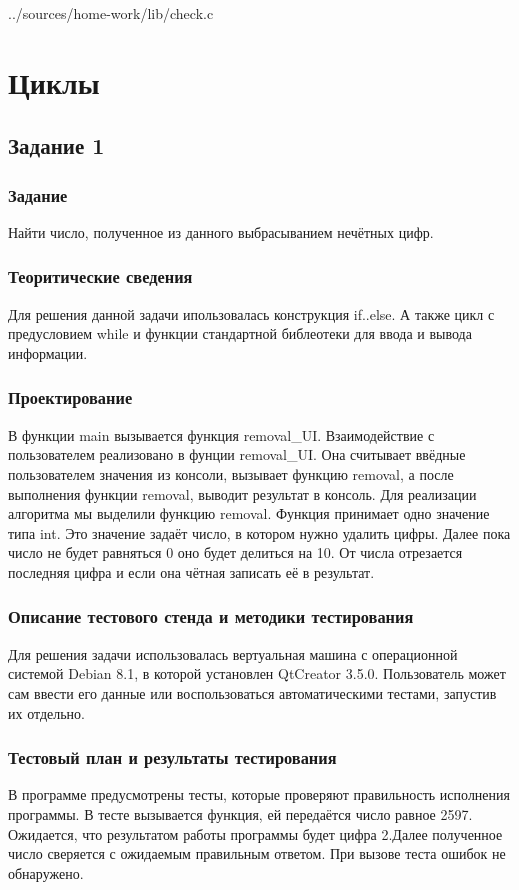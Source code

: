 \documentclass[12pt,a4paper]{report}
\begin{document}

{../sources/home-work/lib/check.c}

\chapter{Циклы}
\section{Задание 1}
\subsection{Задание}
Найти число, полученное из данного выбрасыванием нечётных цифр.
\subsection{Теоритические сведения}
Для решения данной задачи ипользовалась конструкция if..else. А также цикл с предусловием while и функции стандартной библеотеки для ввода и вывода информации.
\subsection{Проектирование}
В функции main вызывается функция removal\_UI. Взаимодействие с пользователем реализовано в фунции removal\_UI. Она считывает ввёдные пользователем значения из консоли, вызывает функцию removal, а после выполнения функции removal, выводит результат в консоль. Для реализации алгоритма мы выделили функцию removal. Функция принимает одно значение типа int. Это значение задаёт число, в котором нужно удалить цифры. Далее пока число не будет равняться 0 оно будет делиться на 10. От числа отрезается последняя цифра и если она чётная записать её в результат.
\subsection{Описание тестового стенда и методики тестирования}
Для решения задачи использовалась вертуальная машина с операционной системой Debian 8.1, в которой установлен QtCreator 3.5.0. 
Пользователь может сам ввести его данные или воспользоваться автоматическими тестами, запустив их отдельно.
\subsection{Тестовый план и результаты тестирования}
В программе предусмотрены тесты, которые проверяют правильность исполнения программы. В тесте вызывается функция, ей передаётся число равное 2597. Ожидается, что результатом работы программы будет цифра 2.Далее полученное число сверяется с ожидаемым правильным ответом. При вызове теста ошибок не обнаружено.
\end{document}
